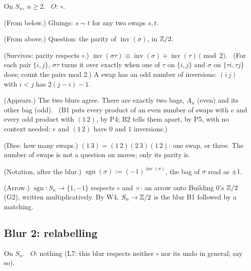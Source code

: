 On $S_n$, $n \ge 2$. \ $O$: $\circ$.

\begin{lines}
\item[\lab{B1}] (From below.) Gluings: $s \sim t$ for any two swaps $s, t$.
\item[\lab{B2}] (From above.) Question: the parity of $\operatorname{inv}(\sigma)$, in $\mathbb{Z}/2$.
\item[\lab{P5}] (Survives: parity respects $\circ$.) $\operatorname{inv}(\sigma\tau) \equiv \operatorname{inv}(\sigma) + \operatorname{inv}(\tau) \pmod 2$. \ (For each pair $\{i, j\}$, $\sigma\tau$ turns it over exactly when one of $\tau$ on $\{i, j\}$ and $\sigma$ on $\{\tau i, \tau j\}$ does; count the pairs mod 2.) A swap has an odd number of inversions: $(i\,j)$ with $i < j$ has $2(j - i) - 1$.
\item[\lab{P6}] (Appears.) The two blurs agree. There are exactly two bags, $A_n$ (even) and its other bag (odd). \ (B1 puts every product of an even number of swaps with $e$ and every odd product with $(1\,2)$, by P4; B2 tells them apart, by P5, with no context needed: $e$ and $(1\,2)$ have $0$ and $1$ inversions.)
\item[\lab{P7}] (Dies: how many swaps.) $(1\,3) = (1\,2)(2\,3)(1\,2)$: one swap, or three. The number of swaps is not a question on moves; only its parity is.
\item[\lab{N1}] (Notation, after the blur.) $\operatorname{sgn}(\sigma) := (-1)^{\operatorname{inv}(\sigma)}$, the bag of $\sigma$ read as $\pm 1$.
\item[\lab{P8}] (Arrow.) $\operatorname{sgn} : S_n \to \{1, -1\}$ respects $\circ$ and $\times$: an arrow onto Building 0's $\mathbb{Z}/2$ (G2), written multiplicatively. By W4, $S_n \to \mathbb{Z}/2$ is the blur B1 followed by a matching.
\end{lines}

\subsection*{Blur 2: relabelling}

On $S_n$. \ $O$: nothing (L7: this blur respects neither $\circ$ nor its undo in general; say so).

